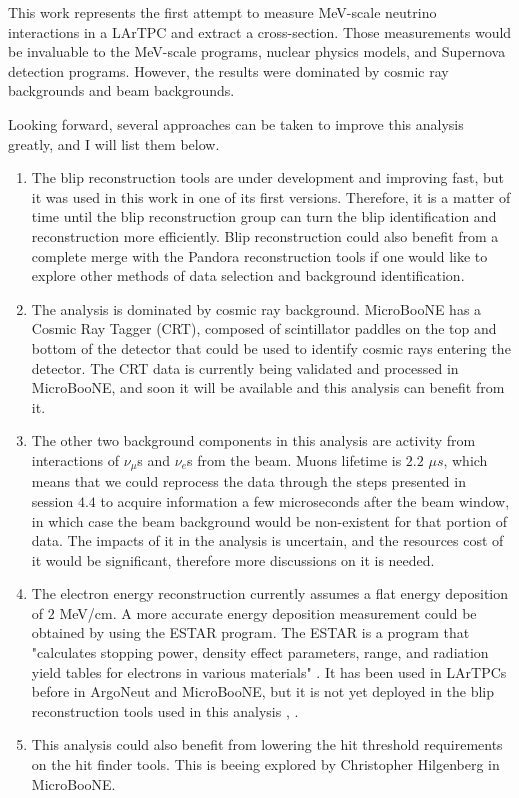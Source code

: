 
This work represents the first attempt to measure MeV-scale neutrino interactions in a LArTPC and extract a cross-section. Those measurements would be invaluable to the MeV-scale programs, nuclear physics models, and Supernova detection programs. 
However, the results were dominated by cosmic ray backgrounds and beam backgrounds. 

Looking  forward, several approaches can be taken to improve this analysis greatly, and I will list them below. 
\begin{enumerate}
 \item The blip reconstruction tools are under development and improving fast, but it was used in this work in one of its first versions. Therefore, it is a matter of time until the blip reconstruction group can turn the blip identification and reconstruction more efficiently. Blip reconstruction could also benefit from a complete merge with the Pandora reconstruction tools if one would like to explore other methods of data selection and background identification.

 \item The analysis is dominated by cosmic ray background. MicroBooNE has a Cosmic Ray Tagger (CRT), composed of scintillator paddles on the top and bottom of the detector that could be used to identify cosmic rays entering the detector. The CRT data is currently being validated and processed in MicroBooNE, and soon it will be available and this analysis can benefit from it. 
 
 \item The other two background components in this analysis are activity from interactions of $\nu_{\mu}$s and $\nu_{e}$s from the beam. Muons lifetime is $2.2$ $\mu s$, which means that we could reprocess the data through the steps presented in session $4.4$ to acquire information a few microseconds after the beam window, in which case the beam background would be non-existent for that portion of data. The impacts of it in the analysis is uncertain, and the resources cost of it would be significant, therefore more discussions on it is needed. 
 
 \item The electron energy reconstruction currently assumes a flat energy deposition of $2$ MeV/cm. A more accurate energy deposition measurement could be obtained by using the ESTAR program. The ESTAR is a program that "calculates stopping power, density effect parameters, range, and radiation yield tables for electrons in various materials" \cite{ESTAR}. It has been used in LArTPCs before in ArgoNeut and MicroBooNE, but it is not yet deployed in the blip reconstruction tools used in this analysis \cite{argoneut_mev}, \cite{microboone_mev}. 
 
 \item This analysis could also benefit from lowering the hit threshold requirements on the hit finder tools. This is beeing explored by Christopher Hilgenberg in MicroBooNE. 
\end{enumerate}
